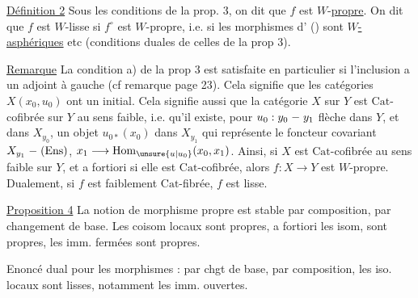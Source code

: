
\uline{Définition 2} Sous les conditions de la prop. 3, on dit que $f$ est $W$-\uline{propre}. On dit que $f$ est $W$-lisse si $f^\circ$ est $W$-propre, i.e. si les morphismes d' () sont \uline{$W$-asphériques} etc (conditions duales de celles de la prop 3).

\uline{Remarque} La condition a) de la prop 3 est satisfaite en particulier si l'inclusion \inserted{(*)} a un adjoint à gauche (cf remarque page 23). Cela signifie que les catégories $X(x_0,u_0)$ ont un  initial. Cela signifie aussi que la catégorie $X$ sur $Y$ est $\mathrm{Cat}$-cofibrée sur $Y$ au sens faible, i.e. qu'il existe, pour $u_0:y_0\mathrel{\relbar}y_1$ flèche dans $Y$,  et  dans $X_{y_0}$, un objet $u_{0*}(x_0)$ dans $X_{y_1}$ qui représente le foncteur covariant $X_{y_1}\mathrel{\relbar}(\mathrm{Ens})$, $x_1\longrightarrow\mathrm{Hom}_{\unsure{u|u_0}}(x_0,x_1)$. Ainsi, si $X$ est $\mathrm{Cat}$-cofibrée au sens faible sur $Y$, et a fortiori si elle est $\mathrm{Cat}$-cofibrée, alors $f:X\longrightarrow Y$ est $W$-propre. Dualement, si $f$ est faiblement $\mathrm{Cat}$-fibrée, $f$ est lisse.

 \uline{Proposition 4}  La notion de morphisme propre est stable par composition, par changement de base. Les coisom locaux sont propres,  a fortiori les isom, sont propres, les imm. fermées sont propres.

Enoncé dual pour les morphismes  :  par chgt de base, par composition, les iso. locaux sont lisses, notamment les imm. ouvertes.

